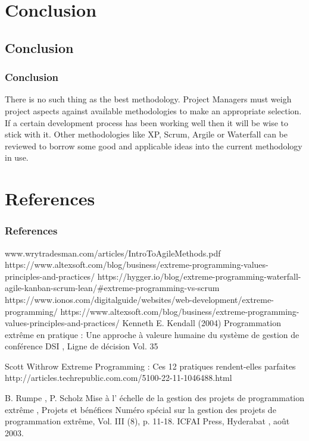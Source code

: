 \documentclass[
	11pt, 
]{beamer}
\begin{document}
\section{Conclusion}
\subsection{Conclusion}
\begin{frame}
	\frametitle{Conclusion}
	There is no such thing as the best methodology. Project Managers must weigh project aspects against available methodologies to make an
	appropriate selection. If a certain development process has been working well then it will be wise to stick with it. Other methodologies like XP,
	Scrum, Argile or Waterfall can be reviewed to borrow some good and applicable ideas into the current methodology in use.\cite{p7,p8}
	\bigskip %
\end{frame}
\section{References}
\begin{frame} %
	\frametitle{References}
	
	\begin{thebibliography}{99} %
		\footnotesize %
		
		 www.wrytradesman.com/articles/IntroToAgileMethods.pdf
		https://www.altexsoft.com/blog/business/extreme-programming-values-principles-and-practices/
		https://hygger.io/blog/extreme-programming-waterfall-agile-kanban-scrum-lean/#extreme-programming-vs-scrum
		https://www.ionos.com/digitalguide/websites/web-development/extreme-programming/
		https://www.altexsoft.com/blog/business/extreme-programming-values-principles-and-practices/
			 Kenneth E. Kendall (2004)
			\newblock Programmation extrême en pratique : Une approche à valeure humaine du système de gestion
			de conférence DSI , Ligne de décision Vol. 35

			Scott Withrow
			\newblock Extreme Programming : Ces 12 pratiques rendent-elles parfaites
http://articles.techrepublic.com.com/5100-22-11-1046488.html

			 B. Rumpe , P. Scholz
			\newblock Mise à l' échelle de la gestion des projets de programmation extrême , Projets et bénéfices
Numéro spécial sur la gestion des projets de programmation extrême, Vol. III (8), p. 11-18. ICFAI Press, Hyderabat ,
août 2003.
	\end{thebibliography}
\end{frame}
\end{document}
